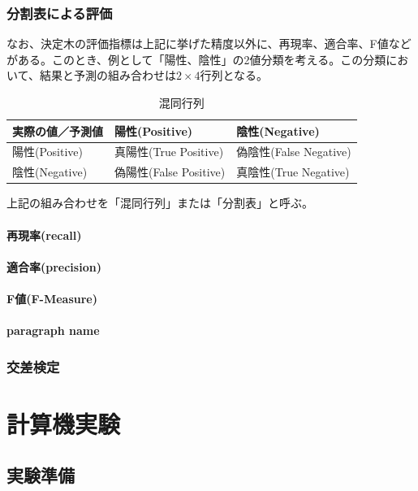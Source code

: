 \documentclass[dvipdfmx]{jsarticle}
\begin{document}
\subsubsection{分割表による評価}
なお、決定木の評価指標は上記に挙げた精度以外に、再現率、適合率、F値などがある。このとき、例として「陽性、陰性」の2値分類を考える。この分類において、結果と予測の組み合わせは$2\times4$行列となる。
\begin{table}[H]
  \begin{center}
    \caption{混同行列}
    \begin{tabular}{|l|l|l|} \hline
      実際の値／予測値 & 陽性(Positive) & 陰性(Negative) \\ \hline
      陽性(Positive) & 真陽性(True Positive) & 偽陰性(False Negative)\\ \hline
      陰性(Negative)　& 偽陽性(False Positive) & 真陰性(True Negative) \\ \hline
    \end{tabular}
    \label{hyo02}
  \end{center}
\end{table}
上記の組み合わせを「混同行列」または「分割表」と呼ぶ。
\paragraph{再現率(recall)}\par

\paragraph{適合率(precision)}
\paragraph{F値(F-Measure)}



\paragraph{paragraph name}

\subsubsection{交差検定}




\section{計算機実験}
\subsection{実験準備}
\end{document}
